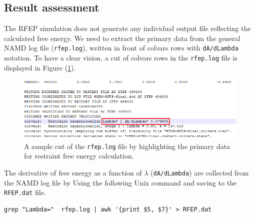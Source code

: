 \documentclass[9pt,tutorial]{livecoms}
\begin{document}
\subsection{Result assessment}
The RFEP simulation does not generate any individual output file reflecting the calculated free energy. We need to extract the primary data from the general NAMD log file (\texttt{rfep.log}), written in front of colvars rows with \texttt{dA/dLambda} notation. To have a clear vision, a cut of colvars rows in the \texttt{rfep.log} file is displayed in Figure (\ref{fig:RFEP1}). 

\begin{figure}[h!t]
\centering
\includegraphics[width=\linewidth]{RFEP-log}
\caption{A sample cut of the \texttt{rfep.log} file by highlighting the primary data for restraint free energy calculation. }
\label{fig:RFEP1}
\end{figure}

The derivative of free energy as a function of {$\lambda$} (\texttt{dA/dLambda}) are collected from the NAMD log file by Using the following Unix command and saving to the \texttt{RFEP.dat} file.
\begin{verbatim}
grep "Lambda="  rfep.log | awk '{print $5, $7}' > RFEP.dat
\end{verbatim}
\end{document}
